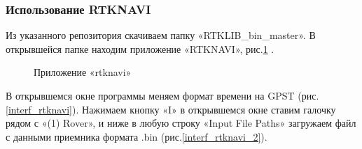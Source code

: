 \documentclass[]{article}
\begin{document}
	\subsubsection{Использование RTKNAVI}
	Из указанного репозитория скачиваем папку «RTKLIB\_bin\_master». В открывшейся папке находим приложение «RTKNAVI», рис.\ref{rtknavi} .
	
	\begin{figure}[h!]
		
		\caption{Приложение «rtknavi»}
		\label{rtknavi}
	\end{figure}

	В открывшемся окне программы меняем формат времени на GPST (рис.\ref{interf_rtknavi}). Нажимаем кнопку «I» в открывшемся окне ставим галочку рядом с «(1) Rover», и ниже в любую строку «Input File Paths» загружаем файл с данными приемника формата .bin (рис.\ref{interf_rtknavi_2}).
	
\end{document}
